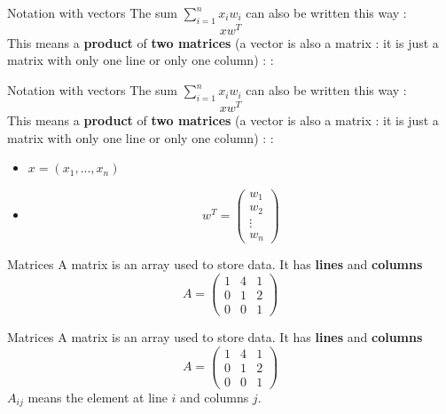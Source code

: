 \documentclass{beamer}
\begin{document}
\begin{frame}{Notation with vectors}
    The sum $   \sum^{n}_{i=1} x_iw_i  $ can also be written this way : 
    \begin{equation}
        xw^T
    \end{equation}
    This means a \textbf{{product}} of \textbf{{two matrices}} (a vector is
    also a matrix : it is just a matrix with only one line or only one column) : 
      : 
\end{frame}
\begin{frame}{Notation with vectors}
    The sum $   \sum^{n}_{i=1} x_iw_i  $ can also be written this way : 
    \begin{equation}
        xw^T
    \end{equation}
    This means a \textbf{{product}} of \textbf{{two matrices}} (a vector is
    also a matrix : it is just a matrix with only one line or only one column) : 
      : 
    \begin{itemize}
        \item $x=(x_1,...,x_n)$
                \item 
$$
w^T=
\begin{pmatrix}
w_1\\
w_2\\
\vdots\\
w_n
\end{pmatrix}
$$
    \end{itemize}
\end{frame}

\begin{frame}{Matrices}
    A matrix is an array used to store data. It has \textbf{{lines}}  and
    \textbf{{columns}} 
$$
A=
\begin{pmatrix}
1 & 4 & 1 \\
0 & 1 & 2 \\
0 & 0 & 1
\end{pmatrix}
$$
\end{frame}


\begin{frame}{Matrices}
    A matrix is an array used to store data. It has \textbf{{lines}}  and
    \textbf{{columns}} 
$$
A=
\begin{pmatrix}
1 & 4 & 1 \\
0 & 1 & 2 \\
0 & 0 & 1
\end{pmatrix}
$$
    $A_{ij}$ means the element at line $i$ and columns $j$.
\end{frame}
\end{document}
